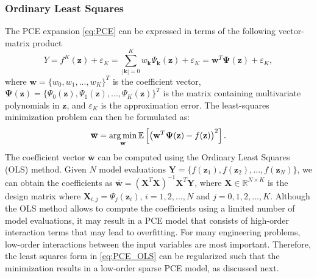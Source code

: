 \subsubsection{Ordinary Least Squares}
The PCE expansion \eqref{eq:PCE} can be expressed in terms of the following vector-matrix product
\begin{equation}\label{eq:LSM}
Y = f^{K}(\mathbf{z}) +\varepsilon_K = \sum_{|\mathbf{k}| = 0}^K w_{\mathbf{k}}\Psi_{\mathbf{k}}(\mathbf{z}) + \varepsilon_K = \mathbf{w}^T\boldsymbol{\Psi}(\mathbf{z}) +\varepsilon_K,
\end{equation} 
where $\mathbf{w} = \{w_0,w_1,...,w_K\}^T$ is the coefficient vector, $\boldsymbol{\Psi}(\mathbf{z}) = \{\Psi_0(\mathbf{z}), \Psi_1(\mathbf{z}), ..., \Psi_K(\mathbf{z})\}^T$ is the matrix containing multivariate polynomials in $\mathbf{z}$, and $\varepsilon_K$ is the approximation error. The least-squares minimization problem can then be formulated as:
\begin{equation}\label{eq:PCE_OLS}
\mathbf{\overline{w}} = \operatorname*{arg\,min}_{\mathbf{w}} \mathbb{E}\left[\left(\mathbf{w}^T \boldsymbol{\Psi}(\mathbf{z}) - f(\mathbf{z})\right)^2\right].
 \end{equation}
The coefficient vector $\mathbf{\overline{w}}$ can be computed using the Ordinary Least Squares (OLS) method. Given $N$ model evaluations $\mathbf{Y} = \{f(\mathbf{z}_1), f(\mathbf{z}_2), ..., f(\mathbf{z}_N)\}$, we can obtain the coefficients as $\overline{\mathbf{w}} = (\mathbf{X}^T\mathbf{X})^{-1}\mathbf{X}^T\mathbf{Y}$, where $\mathbf{X}\in \mathbb{R}^{N\times K}$ is the design matrix where $\mathbf{X}_{i,j} = \Psi_{j}(\mathbf{z}_i)$, $i = 1,2, ..., N$ and $j = 0,1,2,..., K$. Although the OLS method allows to compute the coefficients using a limited number of model evaluations, it may result in a PCE model that consists of high-order interaction terms that may lead to overfitting. For many engineering problems, low-order interactions between the input variables are most important. Therefore, the least squares form in \eqref{eq:PCE_OLS} can be regularized such that the minimization results in a low-order sparse PCE model, as discussed next.

